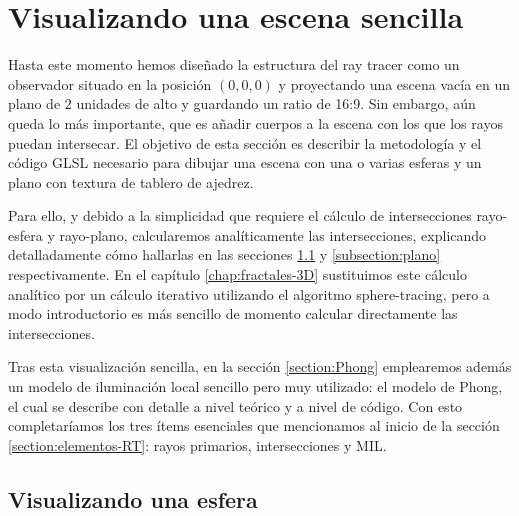 \section{Visualizando una escena sencilla}
\label{section:escena}

Hasta este momento hemos diseñado la estructura del ray tracer como un observador situado en la posición $(0, 0,0)$ y proyectando una escena vacía en un plano de $2$ unidades de alto y guardando un ratio de 16:9. Sin embargo, aún queda lo más importante, que es añadir cuerpos a la escena con los que los rayos puedan intersecar. El objetivo de esta sección es describir la metodología y el código GLSL necesario para dibujar una escena con una o varias esferas y un plano con textura de tablero de ajedrez. 

Para ello, y debido a la simplicidad que requiere el cálculo de intersecciones rayo-esfera y rayo-plano, calcularemos analíticamente las intersecciones, explicando detalladamente cómo hallarlas en las secciones \ref{subsection:esfera} y \ref{subsection:plano} respectivamente. En el capítulo \ref{chap:fractales-3D} sustituimos este cálculo analítico por un cálculo iterativo utilizando el algoritmo sphere-tracing, pero a modo introductorio es más sencillo de momento calcular directamente las intersecciones.

Tras esta visualización sencilla, en la sección \ref{section:Phong} emplearemos además un modelo de iluminación local sencillo pero muy utilizado: el modelo de Phong, el cual se describe con detalle a nivel teórico y a nivel de código. Con esto completaríamos los tres ítems esenciales que mencionamos al inicio de la sección \ref{section:elementos-RT}: rayos primarios, intersecciones y MIL.

\subsection{Visualizando una esfera}
\label{subsection:esfera}

